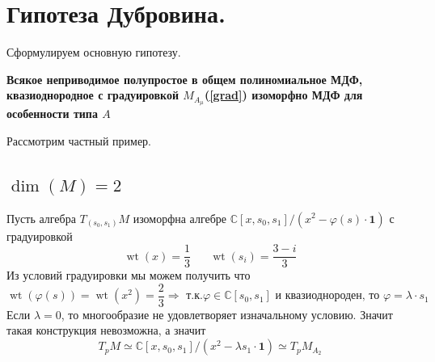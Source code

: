 \documentclass[a4paper, 10pt]{article}
\theoremstyle{plain}
\begin{document}
\section{Гипотеза Дубровина.}
Сформулируем основную гипотезу. \par 
\begin{center}
    \textbf{
        Всякое неприводимое полупростое в общем полиномиальное МДФ, квазиоднородное с градуировкой \(M_{A_\mu}\)(\ref{grad}) изоморфно МДФ для особенности типа \(A\)}
\end{center}
Рассмотрим частный пример.
\subsection{\texorpdfstring{\(\operatorname{dim}(M) = 2\)}{2}}
Пусть алгебра \(T_{(s_0, s_1)}M\) изоморфна алгебре \(\mathbb{C}[x, s_0, s_1]\Big/(x^2 - \varphi(s)\cdot \mathbf{1})\) с градуировкой \[\operatorname{wt}(x) = \dfrac{1}{3} \hspace{20pt} \operatorname{wt}(s_i) = \dfrac{3 - i}{3}\]
Из условий градуировки мы можем получить что \[\operatorname{wt}(\varphi(s)) = \operatorname{wt}(x^2) = \dfrac{2}{3} \Rightarrow \text{ т.к.} \varphi \in \mathbb{C}[s_0, s_1] \text{ и квазиоднороден, то } \varphi = \lambda \cdot s_1\]
Если \(\lambda = 0\), то многообразие не удовлетворяет изначальному условию. Значит такая конструкция невозможна, а значит \[T_pM \simeq \mathbb{C}[x, s_0, s_1]\Big/(x^2 - \lambda s_1\cdot \mathbf{1}) \simeq T_pM_{A_2}\]

\end{document}
